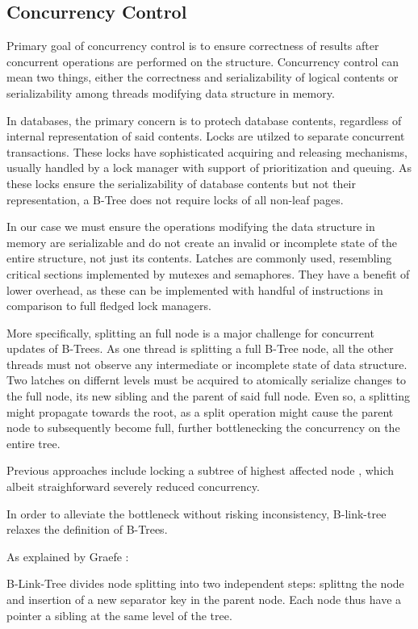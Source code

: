 \subsection{Concurrency Control}

Primary goal of concurrency control is to ensure correctness of results after concurrent operations are performed on the structure. Concurrency control can mean two things, either the correctness and serializability of logical contents or serializability among threads modifying data structure in memory.

In databases, the primary concern is to protech database contents, regardless of internal representation of said contents. Locks are utilzed to separate concurrent transactions. These locks have sophisticated acquiring and releasing mechanisms, usually handled by a lock manager with support of prioritization and queuing. As these locks ensure the serializability of database contents but not their representation, a B-Tree does not require locks of all non-leaf pages.

In our case we must ensure the operations modifying the data structure in memory are serializable and do not create an invalid or incomplete state of the entire structure, not just its contents. Latches are commonly used, resembling critical sections implemented by mutexes and semaphores. They have a benefit of lower overhead, as these can be implemented with handful of instructions in comparison to full fledged lock managers.

More specifically, splitting an full node is a major challenge for concurrent updates of B-Trees. As one thread is splitting a full B-Tree node, all the other threads must not observe any intermediate or incomplete state of data structure. Two latches on differnt levels must be acquired to atomically serialize changes to the full node, its new sibling and the parent of said full node. Even so, a splitting might propagate towards the root, as a split operation might cause the parent node to subsequently become full, further bottlenecking the concurrency on the entire tree.

Previous approaches include locking a subtree of highest affected node \cite{samadi1976b}, which albeit straighforward severely reduced concurrency.

In order to alleviate the bottleneck without risking inconsistency, B-link-tree relaxes the definition of B-Trees.

As explained by Graefe \cite{goetz-tech}:

\begin{definition}
  B-Link-Tree divides node splitting into two independent steps: splittng the node and insertion of a new separator key in the parent node. Each node thus have a pointer a sibling at the same level of the tree.
\end{definition}